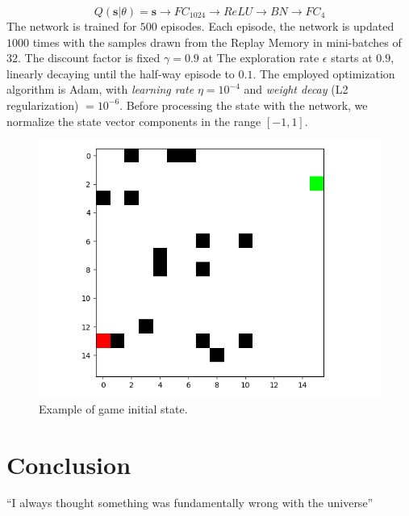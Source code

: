 \documentclass{article}
\begin{document}
\begin{equation}
\label{net}
	Q(\textbf{s}|\theta) = \textbf{s} \rightarrow FC_{1024} \rightarrow ReLU \rightarrow BN \rightarrow FC_{4}
\end{equation}
The network is trained for $500$ episodes. Each episode, the network is updated $1000$ times with the samples drawn from the Replay Memory in mini-batches of $32$. The discount factor is fixed $\gamma=0.9$ at The exploration rate $\epsilon$ starts at $0.9$, linearly decaying until the half-way episode to $0.1$. The employed optimization algorithm is Adam, with \textit{learning rate} $\eta = 10^{-4}$ and \textit{weight decay} (L2 regularization) $= 10^{-6}$.
Before processing the state with the network, we normalize the state vector components in the range $[-1,1]$.
\begin{figure}[h!]
\centering
\includegraphics[width=\textwidth]{game_example}
\caption{Example of game initial state.}
\label{fig:game1}
\end{figure}

\section{Conclusion}
``I always thought something was fundamentally wrong with the universe'' \citep{adams1995hitchhiker}



\end{document}
